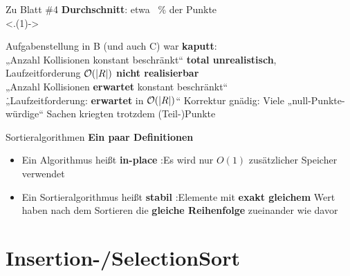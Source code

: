 \begin{frame}[t]{Zu Blatt \#4}
	\textbf{Durchschnitt}: \quad etwa ~\% der Punkte  \\
	\smallskip
	\only<.(1)->{ 
		\begin{itemize}
			\implitem Aufgabenstellung in B (und auch C) war \textbf{kaputt}: \\ 
					  „Anzahl Kollisionen konstant beschränkt“ \textbf{total unrealistisch}, \\
					  Laufzeitforderung $\mathcal{O}\!\left(\left|R\right|\right)$ \textbf{nicht realisierbar} \\ 
					  \pause
					  „Anzahl Kollisionen \textbf{erwartet} konstant beschränkt“ \\
					  \.„Laufzeitforderung: \textbf{erwartet} in $\mathcal{O}\!\left(\left|R\right|\right)$“ 
					  \pause
			\implitem Korrektur gnädig: Viele „null-Punkte-würdige“ Sachen kriegten trotzdem (Teil-)Punkte 
		\end{itemize}	
	}
\end{frame}


\begin{frame}{Sortieralgorithmen}
	\textbf{Ein paar Definitionen} \\[0,125cm]
	\begin{itemize}
		\item Ein Algorithmus heißt \textbf{in-place} :\gdw Es wird nur $O(1)$ zusätzlicher Speicher verwendet
		\pause
		\item Ein Sortieralgorithmus heißt \textbf{stabil} :\gdw Elemente mit \textbf{exakt gleichem} Wert haben nach dem Sortieren die \textbf{gleiche Reihenfolge} zueinander wie davor
	\end{itemize}
\end{frame}

\section{Insertion-/SelectionSort}
	
